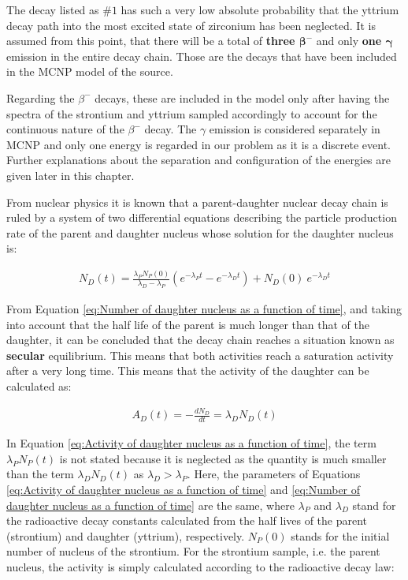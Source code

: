 The decay listed as #\emph{$1$} has such a very low absolute probability that the yttrium decay path into the most excited state of zirconium has been neglected. It is assumed from this point, that there will be a total of \textbf{three $\boldsymbol{\beta}^-$} and only \textbf{one $\boldsymbol{\gamma}$} emission in the entire decay chain. Those are the decays that have been included in the MCNP model of the  source. 

Regarding the $\beta^-$ decays, these are included in the model only after having the spectra of the strontium and yttrium sampled accordingly to account for the continuous nature of the $\beta^-$ decay. The $\gamma$ emission is considered separately in MCNP and only one energy is regarded in our problem as it is a discrete event. Further explanations about the separation and configuration of the energies are given later in this chapter.

From nuclear physics it is known that a parent-daughter nuclear decay chain is ruled by a system of two differential equations describing the particle production rate of the parent and daughter nucleus whose solution \cite{NUK3Notes} for the daughter nucleus is:

\begin{align}
\label{eq:Number of daughter nucleus as a function of time}
    {N_{D}(t) = \frac{\lambda_{P} N_{P} (0)}{\lambda_{D}-\lambda_{P}} (e^{-\lambda_{P} t} -e^{-\lambda_{D} t} )+ N_{D}(0)} \: e^{-\lambda_{D} t}
\end{align}

From Equation \ref{eq:Number of daughter nucleus as a function of time}, and taking into account that the half life of the parent is much longer than that of the daughter, it can be concluded that the decay chain reaches a situation known as \textbf{secular} equilibrium. This means that both activities reach a saturation activity after a very long time. This means that the activity of the daughter can be calculated as:

\begin{align}
\label{eq:Activity of daughter nucleus as a function of time}
    {A_{D}(t) = -\frac{dN_{D}}{dt} =  \lambda_{D}N_{D}(t)}
\end{align}

In Equation \ref{eq:Activity of daughter nucleus as a function of time}, the term $\lambda_{P}N_{P}(t)$ is not stated because it is neglected as the quantity is much smaller than the term $\lambda_{D}N_{D}(t)$ as $\lambda_{D} > \lambda_{P}$. Here, the parameters of Equations \ref{eq:Activity of daughter nucleus as a function of time} and \ref{eq:Number of daughter nucleus as a function of time} are the same, where $\lambda_{P}$ and $\lambda_{D}$ stand for the radioactive decay constants calculated from the half lives of the parent (strontium) and daughter (yttrium), respectively. $N_{P} (0)$ stands for the initial number of nucleus of the strontium. For the strontium sample, i.e. the parent nucleus, the activity is simply calculated according to the radioactive decay law:

